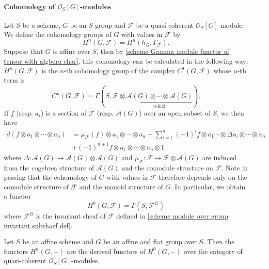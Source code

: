 \paragraph{Cohomology of \texorpdfstring{$\mathscr{O}_S[G]$}{O}-modules}
Let $S$ be a scheme, $G$ be an $S$-group and $\mathscr{F}$ be a quasi-coherent $\mathscr{O}_S[G]$-module. We define the cohomology groups of $G$ with values in $\mathscr{F}$ by
\[H^n(G,\mathscr{F})=H^n(h_G,\Gamma_\mathscr{F}).\]
Suppose that $G$ is affine over $S$, then by \cref{scheme Gamma module functor of tensor with algbera char}, this cohomology can be calculated in the following way: $H^n(G,\mathscr{F})$ is the $n$-th cohomology group of the complex $C^\bullet(G,\mathscr{F})$ whose $n$-th term is 
\[C^n(G,\mathscr{F})=\Gamma(S,\mathscr{F}\otimes\underbrace{\mathscr{A}(G)\otimes\cdots\otimes\mathscr{A}(G)}_{\text{$n$-fold}}).\]
If $f$ (resp. $a_i$) is a section of $\mathscr{F}$ (resp. $\mathscr{A}(G)$) over an open subset of $S$, we then have
\begin{align*}
d(f\otimes a_1\otimes\cdots\otimes a_n)&=\mu_\mathscr{F}(f)\otimes a_1\otimes\cdots\otimes a_n+\sum_{i=1}^{n}(-1)^if\otimes a_1\cdots\otimes \Delta a_i\otimes\cdots\otimes a_n\\
&+(-1)^{n+1}f\otimes a_1\otimes\cdots\otimes a_n\otimes 1
\end{align*}
where $\Delta:\mathscr{A}(G)\to\mathscr{A}(G)\otimes\mathscr{A}(G)$ and $\mu_\mathscr{F}:\mathscr{F}\to\mathscr{F}\otimes\mathscr{A}(G)$ are induced from the cogebrea structure of $\mathscr{A}(G)$ and the comodule structure on $\mathscr{F}$. Note in passing that the cohomology of $G$ with values in $\mathscr{F}$ therefore depends only on the comodule structure of $\mathscr{F}$ and the monoid structure of $G$. In particular, we obtain a functor
\[H^0(G,\mathscr{F})=\Gamma(S,\mathscr{F}^G)\]
where $\mathscr{F}^G$ is the invariant sheaf of $\mathscr{F}$ defined in \cref{scheme module over group invariant subshaef def}.

\begin{theorem}\label{scheme group module over affine flat cohomology is derived}
Let $S$ be an affine scheme and $G$ be an affine and flat group over $S$. Then the functors $H^n(G,-)$ are the derived functors of $H^0(G,-)$ over the category of quasi-coherent $\mathscr{O}_S[G]$-modules. 
\end{theorem}

